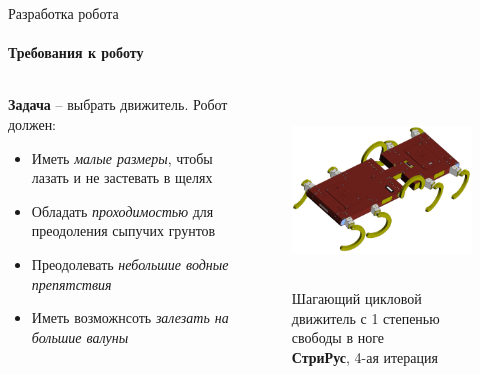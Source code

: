 \documentclass[aspectratio=169,xcolor=table]{beamer}
\begin{document}
\begin{frame}[t]{Разработка робота}
    \framesubtitle{Требования к роботу}
    \large
\vspace{-0.5cm}
    \begin{columns}[T,onlytextwidth]
        \begin{column}{0.49\textwidth}
            \textbf{Задача} --  выбрать движитель. Робот должен:
            \begin{itemize}
                \item Иметь \textit{малые размеры}, чтобы лазать и не застевать в щелях
                \item Обладать \textit{проходимостью} для преодоления сыпучих грунтов
                \item Преодолевать \textit{небольшие водные препятствия}
                \item Иметь возможнсоть \textit{залезать на большие валуны}
            \end{itemize}        
        \end{column}
        \begin{column}{0.49\textwidth}
            \vspace{-1.1cm}
            \begin{figure}[H]
                \centering\includegraphics[height=5cm,width=1\textwidth,keepaspectratio]{strirus_4.png}
                \caption*{Шагающий цикловой движитель с 1 степенью свободы в ноге \\ \textbf{СтриРус}, 4-ая итерация}
                \label{fig:strirus_4.png}
            \end{figure}
        \end{column}
    \end{columns}
\end{frame}
\end{document}
